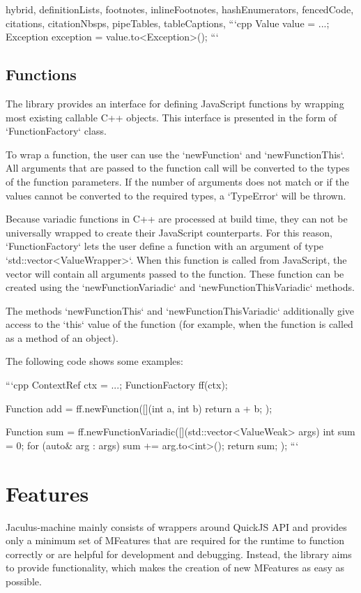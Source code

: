 \begin{markdown*}{%
  hybrid,
  definitionLists,
  footnotes,
  inlineFootnotes,
  hashEnumerators,
  fencedCode,
  citations,
  citationNbsps,
  pipeTables,
  tableCaptions,
}
```cpp
Value value = ...;
Exception exception = value.to<Exception>();
```

\subsection{Functions}

The library provides an interface for defining JavaScript functions by wrapping most existing callable C++ objects. This interface is presented in the form of `FunctionFactory` class.

To wrap a function, the user can use the `newFunction` and `newFunctionThis`. All arguments that are passed to the function call will be converted to the types of the function parameters. If the number of arguments does not match or if the values cannot be converted to the required types, a `TypeError` will be thrown.

Because variadic functions in C++ are processed at build time, they can not be universally wrapped to create their JavaScript counterparts. For this reason, `FunctionFactory` lets the user define a function with an argument of type `std::vector<ValueWrapper>`. When this function is called from JavaScript, the vector will contain all arguments passed to the function. These function can be created using the `newFunctionVariadic` and `newFunctionThisVariadic` methods.

The methods `newFunctionThis` and `newFunctionThisVariadic` additionally give access to the `this` value of the function (for example, when the function is called as a method of an object).

The following code shows some examples:

```cpp
ContextRef ctx = ...;
FunctionFactory ff(ctx);

Function add = ff.newFunction([](int a, int b) { return a + b; });

Function sum = ff.newFunctionVariadic([](std::vector<ValueWeak> args) {
    int sum = 0;
    for (auto& arg : args) {
        sum += arg.to<int>();
    }
    return sum;
});
```


\section{Features}

Jaculus-machine mainly consists of wrappers around QuickJS API and provides only a minimum set of MFeatures that are required for the runtime to function correctly or are helpful for development and debugging. Instead, the library aims to provide functionality, which makes the creation of new MFeatures as easy as possible.


\end{markdown*}
